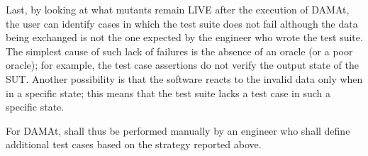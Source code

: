  
Last, by looking at what mutants remain LIVE after the execution of DAMAt, the user can identify cases in which the test suite does not fail although the data being exchanged is not the one expected by the engineer who wrote the test suite. 
The simplest cause of such lack of failures is the absence of an oracle (or a poor oracle); for example, the test case assertions do not verify the output state of the SUT. 
Another possibility is that the software reacts to the invalid data only when in a specific state; this means that the test suite lacks a test case in such a specific state.

For DAMAt,  shall thus be performed manually by an engineer who shall define additional test cases based on the strategy reported above.

